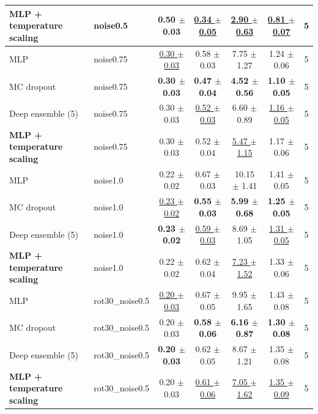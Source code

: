 \begin{tabular}{llccccc}
\textbf{MLP + temperature scaling} & noise0.5 & 0.50 $\pm$ 0.03 & \underline{0.34 $\pm$ 0.05} & \underline{2.90 $\pm$ 0.63} & \underline{0.81 $\pm$ 0.07} & 5 \\
\midrule
MLP & noise0.75 & \underline{0.30 $\pm$ 0.03} & 0.58 $\pm$ 0.03 & 7.75 $\pm$ 1.27 & 1.24 $\pm$ 0.06 & 5 \\
MC dropout & noise0.75 & \textbf{0.30 $\pm$ 0.03} & \textbf{0.47 $\pm$ 0.04} & \textbf{4.52 $\pm$ 0.56} & \textbf{1.10 $\pm$ 0.05} & 5 \\
Deep ensemble (5) & noise0.75 & 0.30 $\pm$ 0.03 & \underline{0.52 $\pm$ 0.03} & 6.60 $\pm$ 0.89 & \underline{1.16 $\pm$ 0.05} & 5 \\
\textbf{MLP + temperature scaling} & noise0.75 & 0.30 $\pm$ 0.03 & 0.52 $\pm$ 0.04 & \underline{5.47 $\pm$ 1.15} & 1.17 $\pm$ 0.06 & 5 \\
\midrule
MLP & noise1.0 & 0.22 $\pm$ 0.02 & 0.67 $\pm$ 0.03 & 10.15 $\pm$ 1.41 & 1.41 $\pm$ 0.05 & 5 \\
MC dropout & noise1.0 & \underline{0.23 $\pm$ 0.02} & \textbf{0.55 $\pm$ 0.03} & \textbf{5.99 $\pm$ 0.68} & \textbf{1.25 $\pm$ 0.05} & 5 \\
Deep ensemble (5) & noise1.0 & \textbf{0.23 $\pm$ 0.02} & \underline{0.59 $\pm$ 0.03} & 8.69 $\pm$ 1.05 & \underline{1.31 $\pm$ 0.05} & 5 \\
\textbf{MLP + temperature scaling} & noise1.0 & 0.22 $\pm$ 0.02 & 0.62 $\pm$ 0.04 & \underline{7.23 $\pm$ 1.52} & 1.33 $\pm$ 0.06 & 5 \\
\midrule
MLP & rot30\_noise0.5 & \underline{0.20 $\pm$ 0.03} & 0.67 $\pm$ 0.05 & 9.95 $\pm$ 1.65 & 1.43 $\pm$ 0.08 & 5 \\
MC dropout & rot30\_noise0.5 & 0.20 $\pm$ 0.03 & \textbf{0.58 $\pm$ 0.06} & \textbf{6.16 $\pm$ 0.87} & \textbf{1.30 $\pm$ 0.08} & 5 \\
Deep ensemble (5) & rot30\_noise0.5 & \textbf{0.20 $\pm$ 0.03} & 0.62 $\pm$ 0.05 & 8.67 $\pm$ 1.21 & 1.35 $\pm$ 0.08 & 5 \\
\textbf{MLP + temperature scaling} & rot30\_noise0.5 & 0.20 $\pm$ 0.03 & \underline{0.61 $\pm$ 0.06} & \underline{7.05 $\pm$ 1.62} & \underline{1.35 $\pm$ 0.09} & 5 \\
\bottomrule
\end{tabular}
